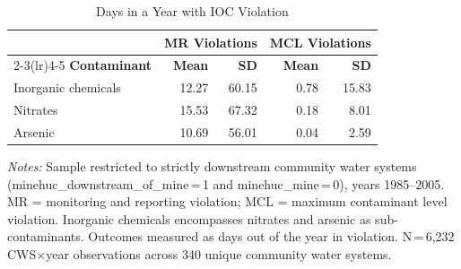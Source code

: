 \begin{table}[htbp]
\centering
\caption{Days in a Year with IOC Violation}
\label{tab:ioc_days_dwnstrm}
\small
\begin{tabular}{lrrrr}
\hline\hline
 & \multicolumn{2}{c}{\textbf{MR Violations}} & \multicolumn{2}{c}{\textbf{MCL Violations}} \\
\cmidrule(lr){2-3}\cmidrule(lr){4-5}
\textbf{Contaminant} & \textbf{Mean} & \textbf{SD} & \textbf{Mean} & \textbf{SD} \\
\hline
Inorganic chemicals & 12.27 & 60.15 & 0.78 & 15.83 \\
Nitrates & 15.53 & 67.32 & 0.18 & 8.01 \\
Arsenic & 10.69 & 56.01 & 0.04 & 2.59 \\
\hline\hline
\end{tabular}
\begin{minipage}{\linewidth}
\vspace{4pt}
\footnotesize
\textit{Notes:} Sample restricted to strictly downstream community water systems (minehuc\_downstream\_of\_mine\,=\,1 and minehuc\_mine\,=\,0), years 1985--2005. MR = monitoring and reporting violation; MCL = maximum contaminant level violation. Inorganic chemicals encompasses nitrates and arsenic as sub-contaminants. Outcomes measured as days out of the year in violation. N\,=\,6,232 CWS$\times$year observations across 340 unique community water systems.
\end{minipage}
\end{table}
